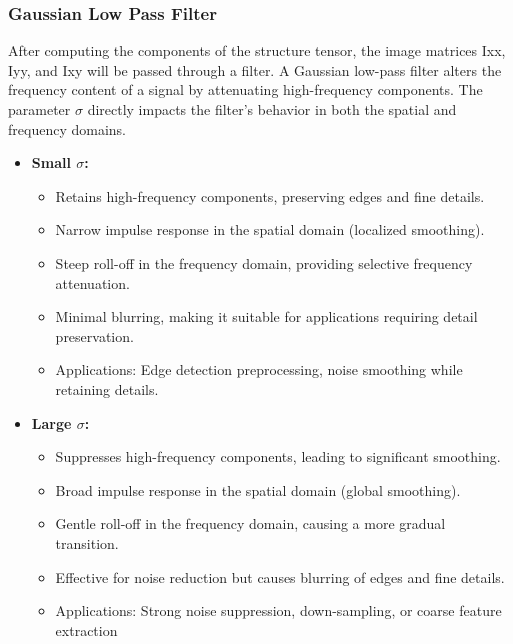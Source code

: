 \documentclass[11pt, conference, letterpaper]{IEEEtran}
\begin{document}
\subsubsection{Gaussian Low Pass Filter}
After computing the components of the structure tensor, the image matrices Ixx, Iyy, and Ixy will be passed through a filter. A Gaussian low-pass filter alters the frequency content of a signal by attenuating high-frequency components. The parameter \(\sigma\) directly impacts the filter's behavior in both the spatial and frequency domains.
\begin{itemize}
    \item \textbf{Small \(\sigma\):}
    \begin{itemize}
        \item Retains high-frequency components, preserving edges and fine details.
        \item Narrow impulse response in the spatial domain (localized smoothing).
        \item Steep roll-off in the frequency domain, providing selective frequency attenuation.
        \item Minimal blurring, making it suitable for applications requiring detail preservation.
        \item Applications: Edge detection preprocessing, noise smoothing while retaining details.
    \end{itemize}
    \item \textbf{Large \(\sigma\):}
    \begin{itemize}
        \item Suppresses high-frequency components, leading to significant smoothing.
        \item Broad impulse response in the spatial domain (global smoothing).
        \item Gentle roll-off in the frequency domain, causing a more gradual transition.
        \item Effective for noise reduction but causes blurring of edges and fine details.
        \item Applications: Strong noise suppression, down-sampling, or coarse feature extraction
    \end{itemize}
\end{itemize}
\end{document}
